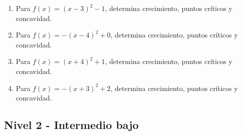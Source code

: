 \documentclass[11pt,a4paper]{article}
\begin{document}
\begin{enumerate}[label=\textbf{E\arabic*.},start=101]
\item Para $f(x)=(x-3)^2-1$, determina crecimiento, puntos críticos y concavidad.

\item Para $f(x)=-(x-4)^2+0$, determina crecimiento, puntos críticos y concavidad.

\item Para $f(x)=(x+4)^2+1$, determina crecimiento, puntos críticos y concavidad.

\item Para $f(x)=-(x+3)^2+2$, determina crecimiento, puntos críticos y concavidad.

\end{enumerate}

\subsection{Nivel 2 - Intermedio bajo}
\end{document}

